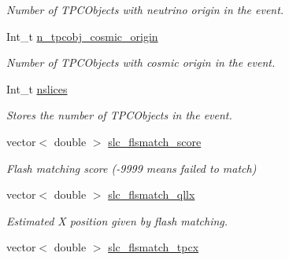 \begin{DoxyCompactItemize}
\begin{DoxyCompactList}\small\item\em Number of T\-P\-C\-Objects with neutrino origin in the event. \end{DoxyCompactList}\item 
\hypertarget{classUBXSecEvent_a64e81de34497d79043b873862c28fd87}{Int\-\_\-t \hyperlink{classUBXSecEvent_a64e81de34497d79043b873862c28fd87}{n\-\_\-tpcobj\-\_\-cosmic\-\_\-origin}}\label{classUBXSecEvent_a64e81de34497d79043b873862c28fd87}

\begin{DoxyCompactList}\small\item\em Number of T\-P\-C\-Objects with cosmic origin in the event. \end{DoxyCompactList}\item 
\hypertarget{classUBXSecEvent_abcf4435958fac040ad4e3c85802eea27}{Int\-\_\-t \hyperlink{classUBXSecEvent_abcf4435958fac040ad4e3c85802eea27}{nslices}}\label{classUBXSecEvent_abcf4435958fac040ad4e3c85802eea27}

\begin{DoxyCompactList}\small\item\em Stores the number of T\-P\-C\-Objects in the event. \end{DoxyCompactList}\item 
\hypertarget{classUBXSecEvent_aac7860c3885997956aabf560254afb42}{vector$<$ double $>$ \hyperlink{classUBXSecEvent_aac7860c3885997956aabf560254afb42}{slc\-\_\-flsmatch\-\_\-score}}\label{classUBXSecEvent_aac7860c3885997956aabf560254afb42}

\begin{DoxyCompactList}\small\item\em Flash matching score (-\/9999 means failed to match) \end{DoxyCompactList}\item 
\hypertarget{classUBXSecEvent_abc1d1ba9d1ce91ae8784f3e99deb6ebb}{vector$<$ double $>$ \hyperlink{classUBXSecEvent_abc1d1ba9d1ce91ae8784f3e99deb6ebb}{slc\-\_\-flsmatch\-\_\-qllx}}\label{classUBXSecEvent_abc1d1ba9d1ce91ae8784f3e99deb6ebb}

\begin{DoxyCompactList}\small\item\em Estimated X position given by flash matching. \end{DoxyCompactList}\item 
\hypertarget{classUBXSecEvent_afc096cb78a5130678717f9c513e6b90c}{vector$<$ double $>$ \hyperlink{classUBXSecEvent_afc096cb78a5130678717f9c513e6b90c}{slc\-\_\-flsmatch\-\_\-tpcx}}\label{classUBXSecEvent_afc096cb78a5130678717f9c513e6b90c}


\end{DoxyCompactItemize}
